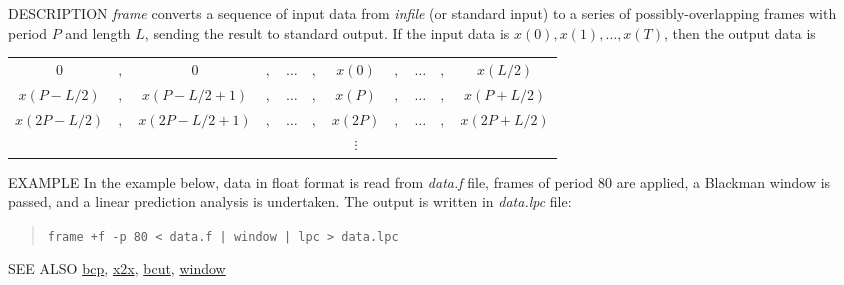 \begin{synopsis}
 \item [frame] [ --l $L$ ] [ --n ] [ --p $P$ ] [ +{\em type} ] [ {\em infile} ]
\end{synopsis}

\begin{qsection}{DESCRIPTION}
{\em frame} converts a sequence of input data 
from {\em infile} (or standard input) 
to a series of possibly-overlapping frames with period $P$ and length $L$, 
sending the result to standard output.
If the input data is $x(0),x(1),\ldots,x(T)$, then the output data is
\begin{center}
\begin{tabular}{ccccccccccc}
$0$&$,$&$0$&$,$&$\ldots$&$,$&$x(0)$&$,$&$\ldots$&$,$&$x(L/2)$\\
$x(P-L/2)$&$,$&$x(P-L/2+1)$&$,$&$\ldots$&$,$&$x(P)$&$,$&$\ldots$&$,$&$x(P+L/2)$\\
$x(2P-L/2)$&$,$&$x(2P-L/2+1)$&$,$&$\ldots$&$,$&$x(2P)$&$,$&$\ldots$&$,$&$x(2P+L/2)$\\
&&&&&&$\vdots$&&&&
\end{tabular}
\end{center}

\end{qsection}

\begin{options}
\end{options}


\begin{qsection}{EXAMPLE}
In the example below, data in float format is read from {\em data.f} file,
frames of period 80 are applied, a Blackman window is passed, and
a linear prediction analysis is undertaken. The output is written in
{\em data.lpc} file:
\begin{quote}
 \verb!frame +f -p 80 < data.f | window | lpc > data.lpc!
\end{quote} 
\end{qsection}

\begin{qsection}{SEE ALSO}
\hyperlink{bcp}{bcp},
\hyperlink{x2x}{x2x},
\hyperlink{bcut}{bcut},
\hyperlink{window}{window}
\end{qsection}
